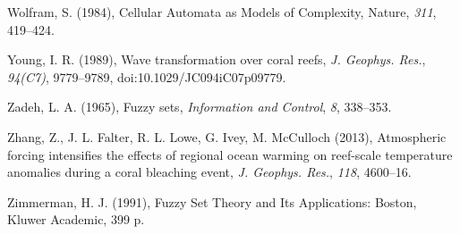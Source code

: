 \documentclass[default,jgrga]{agutex2015}
\begin{document}
\begin{article}
\begin{thebibliography}{}
Wolfram, S. (1984), Cellular Automata as Models of Complexity, Nature, \textit{311}, 419--424.

Young, I. R. (1989), Wave transformation over coral reefs, \textit{J. Geophys. Res.}, \textit{94(C7)}, 9779--9789, doi:10.1029/JC094iC07p09779.

Zadeh, L. A. (1965), Fuzzy sets, \textit{Information and Control}, \textit{8}, 338--353.

Zhang, Z., J. L. Falter, R. L. Lowe, G. Ivey, M. McCulloch (2013), Atmospheric forcing intensifies the effects of regional ocean warming on reef-scale temperature anomalies during a coral bleaching event, \textit{J. Geophys. Res.}, \textit{118}, 4600–16.

Zimmerman, H. J. (1991), Fuzzy Set Theory and Its Applications: Boston, Kluwer Academic, 399 p.

%
%
%
%

\end{thebibliography}




\end{article}
\end{document}

